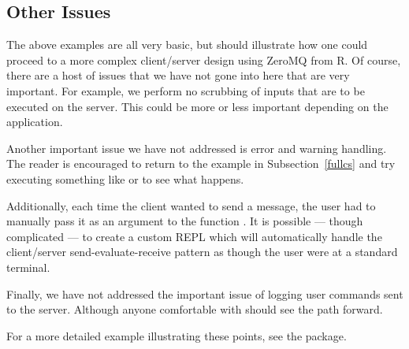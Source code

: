 \subsection{Other Issues}

The above examples are all very basic, but should illustrate how one could
proceed to a more complex client/server design using ZeroMQ from R.  Of course,
there are a host of issues that we have not gone into here that are very 
important.  For example, we perform no scrubbing of inputs that are to be 
executed on the server.  This could be more or less important depending on the
application.  

Another important issue we have not addressed is error and warning handling.
The reader is encouraged to return to the example in Subsection~\ref{fullcs}
and try executing something like 
or
to see what happens.

Additionally, each time the client wanted to send a message,
the user had to manually pass it as an argument to the function 
.  It is possible --- though complicated --- to create a
custom REPL which will automatically handle the client/server 
send-evaluate-receive pattern as though the user were at a standard 
terminal.

Finally, we have not addressed the important issue of logging user commands
sent to the server.  Although anyone comfortable with  should
see the path forward.

For a more detailed example illustrating these points, see the 
package.